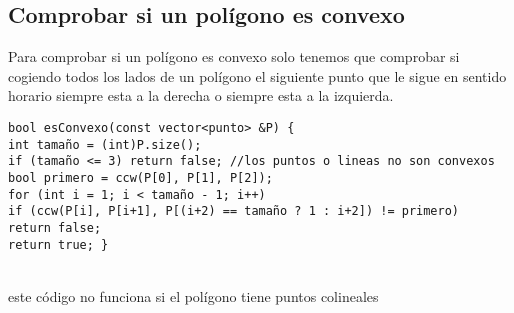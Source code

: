 \subsection{Comprobar si un polígono es convexo}
Para comprobar si un polígono es convexo solo tenemos que comprobar si cogiendo todos los lados de un polígono el siguiente punto
que le sigue en sentido horario siempre esta a la derecha o siempre esta a la izquierda.
\begin{lstlisting}[style=C]
bool esConvexo(const vector<punto> &P) {
int tamaño = (int)P.size();
if (tamaño <= 3) return false; //los puntos o lineas no son convexos
bool primero = ccw(P[0], P[1], P[2]);
for (int i = 1; i < tamaño - 1; i++)
if (ccw(P[i], P[i+1], P[(i+2) == tamaño ? 1 : i+2]) != primero)
return false;
return true; }
\end{lstlisting}
\\este código no funciona si el polígono tiene puntos colineales 
